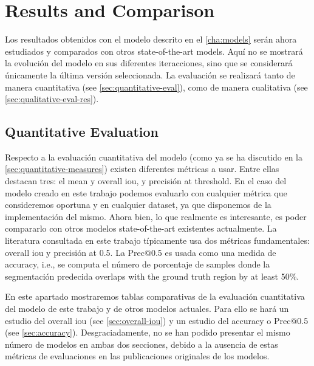 

\chapter{Results and Comparison}\label{cha:results}



Los resultados obtenidos con el modelo descrito en el \vref{cha:models} serán
ahora estudiados y comparados con otros state-of-the-art models. Aquí no se
mostrará la evolución del modelo en sus diferentes iteracciones, sino que se
considerará únicamente la última versión seleccionada. La evaluación se
realizará tanto de manera cuantitativa (see \vref{sec:quantitative-eval}), como
de manera cualitativa (see \vref{sec:qualitative-eval-res}).



\section{Quantitative Evaluation}\label{sec:quantitative-eval}

Respecto a la evaluación cuantitativa del modelo (como ya se ha discutido en la
\vref{sec:quantitative-measures}) existen diferentes métricas a usar. Entre
ellas destacan tres: el mean y overall \gls{iou}, y precisión at threshold. En
el caso del modelo creado en este trabajo podemos evaluarlo con cualquier
métrica que consideremos oportuna y en cualquier dataset, ya que disponemos de
la implementación del mismo. Ahora bien, lo que realmente es interesante, es
poder compararlo con otros modelos state-of-the-art existentes actualmente. La
literatura consultada en este trabajo típicamente usa dos métricas
fundamentales: overall \gls{iou} y precisión at 0.5. La Prec@0.5 es usada como
una medida de accuracy, i.e., se computa el número de porcentaje de samples
donde la segmentación predecida overlaps with the ground truth region by at
least 50\%.

En este apartado mostraremos tablas comparativas de la evaluación cuantitativa
del modelo de este trabajo y de otros modelos actuales. Para ello se hará un
estudio del overall \gls{iou} (see \vref{sec:overall-iou}) y un estudio del
accuracy o Prec@0.5 (see \vref{sec:accuracy}). Desgraciadamente, no se han
podido presentar el mismo número de modelos en ambas dos secciones, debido a
la ausencia de estas métricas de evaluaciones en las publicaciones originales
de los modelos.


